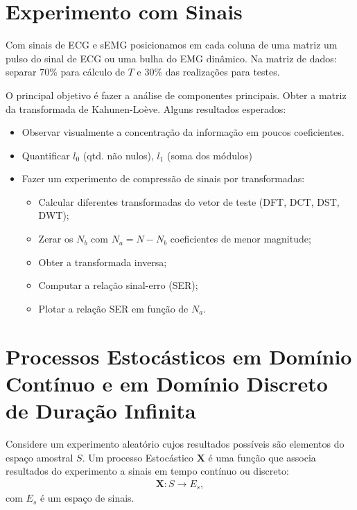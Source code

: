 \documentclass{article}
\begin{document}
\setlength{\abovedisplayskip}{12pt}
\setlength{\belowdisplayskip}{12pt}
\setlength{\abovedisplayshortskip}{0pt}
\setlength{\belowdisplayshortskip}{0pt}
\setlength{\jot}{1pt}

\section{Experimento com Sinais}
Com sinais de ECG e sEMG posicionamos em cada coluna de uma matriz um pulso do sinal de ECG ou uma
bulha do EMG dinâmico. Na matriz de dados: separar 70\% para cálculo de $T$ e 30\% das realizações
para testes.

O principal objetivo é fazer a análise de componentes principais. Obter a matriz da transformada de
Kahunen-Loève. Alguns resultados esperados:
\begin{itemize}
    \item Observar visualmente a concentração da informação em poucos coeficientes.
    \item Quantificar $l_0$ (qtd. não nulos), $l_1$ (soma dos módulos)
    \item Fazer um experimento de compressão de sinais por transformadas:
    \begin{itemize}
        \item Calcular diferentes transformadas do vetor de teste (DFT, DCT, DST, DWT);
        \item Zerar os $N_b$ com $N_a = N - N_b$ coeficientes de menor magnitude;
        \item Obter a transformada inversa;
        \item Computar a relação sinal-erro (SER);
        \item Plotar a relação SER em função de $N_a$.
    \end{itemize}
\end{itemize}

\section{Processos Estocásticos em Domínio Contínuo e em Domínio Discreto de Duração Infinita}
Considere um experimento aleatório cujos resultados possíveis são elementos do espaço amostral $S$.
Um processo Estocástico $\mathbf{X}$ é uma função que associa resultados do experimento a sinais em
tempo contínuo ou discreto:
\begin{align*}
    \mathbf{X}: S \to E_s,
\end{align*}
com $E_s$ é um espaço de sinais.
\end{document}
